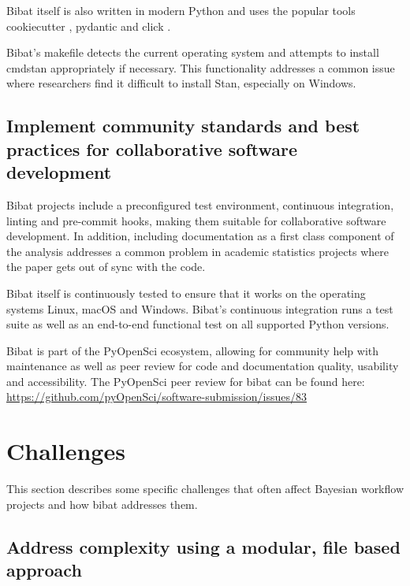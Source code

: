 \documentclass[sigconf, review]{acmart}
\begin{document}
Bibat itself is also written in modern Python and uses the popular tools
cookiecutter \citep{greenfeldCookiecutter2021}, pydantic and click
\citep{clickdevelopersClickPythonComposable2022}.

Bibat's makefile detects the current operating system and attempts to
install cmdstan appropriately if necessary. This functionality addresses
a common issue where researchers find it difficult to install Stan,
especially on Windows.

\subsection{Implement community standards and best practices for
collaborative software
development}\label{implement-community-standards-and-best-practices-for-collaborative-software-development}

Bibat projects include a preconfigured test environment, continuous
integration, linting and pre-commit hooks, making them suitable for
collaborative software development. In addition, including documentation
as a first class component of the analysis addresses a common problem in
academic statistics projects where the paper gets out of sync with the
code.

Bibat itself is continuously tested to ensure that it works on the
operating systems Linux, macOS and Windows. Bibat's continuous
integration runs a test suite as well as an end-to-end functional test
on all supported Python versions.

Bibat is part of the PyOpenSci ecosystem, allowing for community help
with maintenance as well as peer review for code and documentation
quality, usability and accessibility. The PyOpenSci peer review for
bibat can be found here:
\url{https://github.com/pyOpenSci/software-submission/issues/83}

\section{Challenges}\label{challenges}

This section describes some specific challenges that often affect
Bayesian workflow projects and how bibat addresses them.

\subsection{Address complexity using a modular, file based
approach}\label{address-complexity-using-a-modular-file-based-approach}
\end{document}
